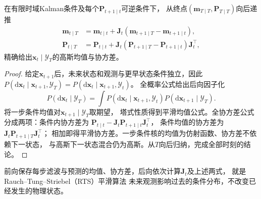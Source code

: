 \begin{theorem}[有限时域RTS平滑]
 \label{thm:dynamical-rts-smoother}
 在有限时域Kalman条件及每个$\bm P_{t+1\mid t}$可逆条件下，
 从终点$(\bm m_{T\mid T},\bm P_{T\mid T})$向后递推
 \begin{align}
  \bm m_{t\mid T}
   &=\bm m_{t\mid t}+\bm J_t(\bm m_{t+1\mid T}-\bm m_{t+1\mid t}),
       \label{eq:dynamical-rts-smoothed-mean}\\
  \bm P_{t\mid T}
   &=\bm P_{t\mid t}
         +\bm J_t(\bm P_{t+1\mid T}-\bm P_{t+1\mid t})\bm J_t^\top,
       \label{eq:dynamical-rts-smoothed-covariance}
 \end{align}
 精确给出$\bm x_t\mid\mathcal Y_T$的高斯均值与协方差。
\end{theorem}
\begin{proof}
 给定$\bm x_{t+1}$后，未来状态和观测与更早状态条件独立，因此
 $P(\mathrm d\bm x_t\mid\bm x_{t+1},\mathcal Y_T)
   =P(\mathrm d\bm x_t\mid\bm x_{t+1},\mathcal Y_t)$。
 全概率公式给出后向因子化
 \begin{equation}
  P(\mathrm d\bm x_t\mid\mathcal Y_T)
   =\int P(\mathrm d\bm x_t\mid\bm x_{t+1},\mathcal Y_t)
                   P(\mathrm d\bm x_{t+1}\mid\mathcal Y_T).
  \label{eq:dynamical-rts-backward-factorization}
 \end{equation}
 将一步条件均值对$\bm x_{t+1}\mid\mathcal Y_T$取期望，
 塔式性质得到平滑均值公式。全协方差公式分成两项：条件内协方差为
 $\bm P_{t\mid t}-\bm J_t\bm P_{t+1\mid t}\bm J_t^\top$，
 条件均值的协方差为$\bm J_t\bm P_{t+1\mid T}\bm J_t^\top$；
 相加即得平滑协方差。一步条件核的均值为仿射函数、协方差不依赖下一状态，
 与高斯下一状态混合仍为高斯。从$T$向后归纳，完成全部时刻的结论。
\end{proof}

前向保存每步滤波与预测的均值、协方差，后向依次计算$\bm J_t$及上述两式，
就是Rauch--Tung--Striebel（RTS）平滑算法
未来观测影响过去的条件分布，不改变已经发生的物理状态。

